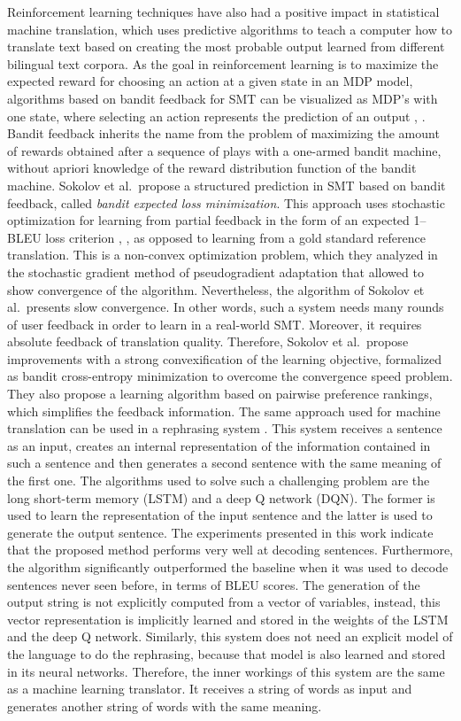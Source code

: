 Reinforcement learning techniques have also had a positive impact in statistical machine translation, which uses predictive algorithms to teach a computer how to translate text based on creating the most probable output learned from different bilingual text corpora. As the goal in reinforcement learning is to maximize the expected reward for choosing an action at a given state in an MDP model, algorithms based on bandit feedback for SMT can be visualized as MDP's with one state, where selecting an action represents the prediction of an output , . Bandit feedback inherits the name from the problem of maximizing the amount of rewards obtained after a sequence of plays with a one-armed bandit machine, without apriori knowledge of the reward distribution function of the bandit machine. Sokolov et al.\  propose a structured prediction in SMT based on bandit feedback, called \emph{bandit expected loss minimization}. This approach uses stochastic optimization for learning from partial feedback in the form of an expected 1--BLEU loss criterion , , as opposed to learning from a gold standard reference translation. This is a non-convex optimization problem, which they analyzed in the stochastic gradient method of pseudogradient adaptation  that allowed to show convergence of the algorithm. Nevertheless, the algorithm of Sokolov et al.\  presents slow convergence. In other words, such a system needs many rounds of user feedback in order to learn in a real-world SMT. Moreover, it requires absolute feedback of translation quality. Therefore, Sokolov et al.\  propose improvements with a strong convexification of the learning objective, formalized as bandit cross-entropy minimization to overcome the convergence speed problem. They also propose a learning algorithm based on pairwise preference rankings, which simplifies the feedback information.
The same approach used for machine translation can be used in a rephrasing system . This system receives a sentence as an input, creates an internal representation of the information contained in such a sentence and then generates a second sentence with the same meaning of the first one.  The algorithms used to solve such a challenging problem are the long short-term memory (LSTM) and a deep Q network (DQN). The former is used to learn the representation of the input sentence and the latter is used to generate the output sentence. The experiments presented in this work indicate that the proposed method performs very well at decoding sentences. Furthermore, the algorithm significantly outperformed the baseline when it was used to decode sentences never seen before, in terms of BLEU scores. The generation of the output string is not explicitly computed from a vector of variables, instead, this vector representation is implicitly learned and stored in the weights of the LSTM and the deep Q network. Similarly, this system does not need an explicit model of the language to do the rephrasing, because that model is also learned and stored in its neural networks. Therefore, the inner workings of this system are the same as a machine learning translator. It receives a string of words as input and generates another string of words with the same meaning.  
